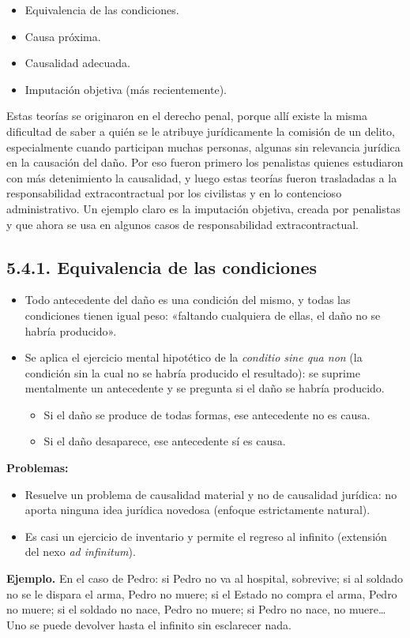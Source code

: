 \begin{itemize}
\item Equivalencia de las condiciones.
\item Causa próxima.
\item Causalidad adecuada.
\item Imputación objetiva (más recientemente).
\end{itemize}
Estas teorías se originaron en el derecho penal, porque allí existe la misma dificultad de saber a quién se le atribuye jurídicamente la comisión de un delito, especialmente cuando participan muchas personas, algunas sin relevancia jurídica en la causación del daño. Por eso fueron primero los penalistas quienes estudiaron con más detenimiento la causalidad, y luego estas teorías fueron trasladadas a la responsabilidad extracontractual por los civilistas y en lo contencioso administrativo. Un ejemplo claro es la imputación objetiva, creada por penalistas y que ahora se usa en algunos casos de responsabilidad extracontractual.

\subsection{5.4.1. Equivalencia de las condiciones}
\begin{itemize}
\item Todo antecedente del daño es una condición del mismo, y todas las condiciones tienen igual peso: «faltando cualquiera de ellas, el daño no se habría producido».
\item Se aplica el ejercicio mental hipotético de la \textit{conditio sine qua non} (la condición sin la cual no se habría producido el resultado): se suprime mentalmente un antecedente y se pregunta si el daño se habría producido.
\begin{itemize}
\item Si el daño se produce de todas formas, ese antecedente no es causa.
\item Si el daño desaparece, ese antecedente sí es causa.
\end{itemize}
\end{itemize}
\textbf{Problemas:}

\begin{itemize}
\item Resuelve un problema de causalidad material y no de causalidad jurídica: no aporta ninguna idea jurídica novedosa (enfoque estrictamente natural).
\item Es casi un ejercicio de inventario y permite el regreso al infinito (extensión del nexo \textit{ad infinitum}).
\end{itemize}
\begin{ejemplo}
\textcolor[HTML]{4F6228}{\textbf{Ejemplo. }}En el caso de Pedro: si Pedro no va al hospital, sobrevive; si al soldado no se le dispara el arma, Pedro no muere; si el Estado no compra el arma, Pedro no muere; si el soldado no nace, Pedro no muere; si Pedro no nace, no muere… Uno se puede devolver hasta el infinito sin esclarecer nada.
\end{ejemplo}
